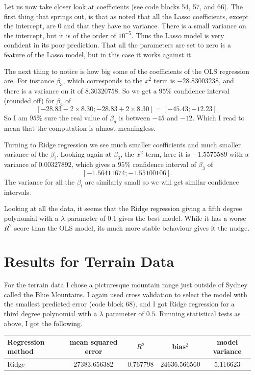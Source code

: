 \documentclass[parskip=half]{scrartcl}
\theoremstyle{definition}
\theoremstyle{remark}
\begin{document}
Let us now take closer look at coefficients (see code blocks 54, 57, and 66).
The first thing that springs out, is that as noted that all the Lasso coefficients, except the intercept, are $0$ and that they have no variance. 
There is a small variance on the intercept, but it is of the order of $10^{-5}$. 
Thus the Lasso model is very confident in its poor prediction. 
That all the parameters are set to zero is a feature of the Lasso model, but in this case it works against it. 

The next thing to notice is how big some of the coefficients of the OLS regression are.
For instance $\beta_3$, which corresponds to the $x^2$ term is $-28.83003238$, and there is a variance on it of $8.30320758$.
So we get a $95\%$ confidence interval (rounded off) for $\beta_4$ of 
\[
	[-28.83 - 2 \times 8.30; -28.83 + 2 \times 8.30] = [-45.43; -12.23].  
\]
So I am $95\%$ sure the real value of $\beta_d$ is between $-45$ and $-12$.
Which I read to mean that the computation is almost meaningless. 

Turning to Ridge regression we see much smaller coefficients and much smaller variance of the $\beta_i$. 
Looking again at $\beta_3$, the $x^2$ term, here it is $-1.5575589$ with a variance of $0.00327892$, which gives a $95\%$ confidence interval of $\beta_3$ of 
\[
	[-1.56411674; -1.55100106].
\]
The variance for all the $\beta_i$ are similarly small so we will get similar confidence intervals. 

Looking at all the data, it seems that the Ridge regression giving a fifth degree polynomial with a $\lambda$ parameter of $0.1$ gives the best model. 
While it has a worse $R^2$ score than the OLS model, its much more stable behaviour gives it the nudge. 

\section{Results for Terrain Data} \label{sec:terrain}

For the terrain data I chose a picturesque mountain range just outside of Sydney called the Blue Mountains. 
I again used cross validation to select the model with the smallest predicted error (code block 68), and I got Ridge regression for a third degree polynomial with a $\lambda$ parameter of $0.5$.
Running statistical tests as above, I got the following.

\begin{tabular}{l|cccc}
Regression method & mean squared error & $R^2$ & bias$^2$ & model variance  \\ 
\hline
\hline 
Ridge & 27383.656382 & 0.767798 & 24636.566560 & 5.116623 \\ 
\end{tabular} 
\end{document}
